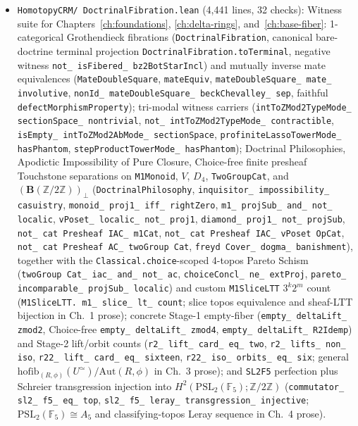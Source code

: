 \begin{itemize}
  \item \texttt{HomotopyCRM/ DoctrinalFibration.lean} (4,441 lines, 32 checks): Witness suite for Chapters~\ref{ch:foundations}, \ref{ch:delta-rings}, and~\ref{ch:base-fiber}: 1-categorical Grothendieck fibrations (\texttt{DoctrinalFibration}, canonical bare-doctrine terminal projection \texttt{DoctrinalFibration.toTerminal}, negative witness \texttt{not\_ isFibered\_ bz2BotStarIncl}) and mutually inverse mate equivalences (\texttt{MateDoubleSquare}, \texttt{mateEquiv}, \texttt{mateDoubleSquare\_ mate\_ involutive}, \texttt{nonId\_ mateDoubleSquare\_ beckChevalley\_ sep}, faithful \texttt{defectMorphismProperty}); tri-modal witness carriers (\texttt{intToZMod2TypeMode\_ sectionSpace\_ nontrivial}, \texttt{not\_ intToZMod2TypeMode\_ contractible}, \texttt{isEmpty\_ intToZMod2AbMode\_ sectionSpace}, \texttt{profiniteLassoTowerMode\_ hasPhantom}, \texttt{stepProductTowerMode\_ hasPhantom}); Doctrinal Philosophies, Apodictic Impossibility of Pure Closure, Choice-free finite presheaf Touchstone separations on \texttt{M1Monoid}, $V$, $D_4$, \texttt{TwoGroupCat}, and $(\mathbf{B}(\mathbb{Z}/2\mathbb{Z}))_\bot$ (\texttt{DoctrinalPhilosophy}, \texttt{inquisitor\_ impossibility\_ casuistry}, \texttt{monoid\_ proj1\_ iff\_ rightZero}, \texttt{m1\_ projSub\_ and\_ not\_ localic}, \texttt{vPoset\_ localic\_ not\_ proj1}, \texttt{diamond\_ proj1\_ not\_ projSub}, \texttt{not\_ cat Presheaf IAC\_ m1Cat}, \texttt{not\_ cat Presheaf IAC\_ vPoset OpCat}, \texttt{not\_ cat Presheaf AC\_ twoGroup Cat}, \texttt{freyd Cover\_ dogma\_ banishment}), together with the \texttt{Classical.choice}-scoped 4-topos Pareto Schism (\texttt{twoGroup Cat\_ iac\_ and\_ not\_ ac}, \texttt{choiceConcl\_ ne\_ extProj}, \texttt{pareto\_ incomparable\_ projSub\_ localic}) and custom \texttt{M1SliceLTT} $3^k 2^m$ count (\texttt{M1SliceLTT. m1\_ slice\_ lt\_ count}; slice topos equivalence and sheaf-LTT bijection in Ch.~1 prose); concrete Stage-1 empty-fiber (\texttt{empty\_ deltaLift\_ zmod2}, Choice-free \texttt{empty\_ deltaLift\_ zmod4}, \texttt{empty\_ deltaLift\_ R2Idemp}) and Stage-2 lift/orbit counts (\texttt{r2\_ lift\_ card\_ eq\_ two}, \texttt{r2\_ lifts\_ non\_ iso}, \texttt{r22\_ lift\_ card\_ eq\_ sixteen}, \texttt{r22\_ iso\_ orbits\_ eq\_ six}; general $\mathrm{hofib}_{(R,\phi)}(U^{\simeq})/\mathrm{Aut}(R,\phi)$ in Ch.~3 prose); and \texttt{SL2F5} perfection plus Schreier transgression injection into $H^2(\mathrm{PSL}_2(\mathbb{F}_5); \mathbb{Z}/2\mathbb{Z})$ (\texttt{commutator\_ sl2\_ f5\_ eq\_ top}, \texttt{sl2\_ f5\_ leray\_ transgression\_ injective}; $\mathrm{PSL}_2(\mathbb{F}_5) \cong A_5$ and classifying-topos Leray sequence in Ch.~4 prose).
\end{itemize}


